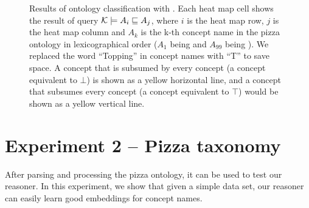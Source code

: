 \begin{figure}
\caption{
Results of ontology classification with \factpp{}.
Each heat map cell shows the result of query $\mathcal{K} \models A_i \sqsubseteq A_j$, where $i$ is the heat map row, $j$ is the heat map column and $A_k$ is the k-th concept name in the pizza ontology in lexicographical order ($A_1$ being  and $A_{99}$ being ).
We replaced the word ``Topping'' in concept names with ``T'' to save space.
A concept that is subsumed by every concept (a concept equivalent to $\bot$) is shown as a yellow horizontal line, and a concept that subsumes every concept (a concept equivalent to $\top$) would be shown as a yellow vertical line.
}
\label{fig:pizza-heatmap}
\end{figure}

\section{Experiment 2 -- Pizza taxonomy}

After parsing and processing the pizza ontology, it can be used to test our reasoner. In this experiment, we show that given a simple data set, our reasoner can easily learn good embeddings for concept names.

